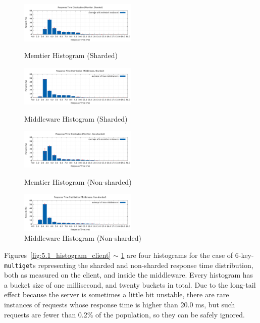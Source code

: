 \begin{figure}[!h]
\parbox{.5\linewidth}{
\centering
\includegraphics[width=0.5\textwidth]{img/5_1_histogram_client.png}
\captionsetup{justification=centering}
\caption{\label{fig:5.1_histogram_client}Memtier Histogram (Sharded)}
}
\parbox{.5\linewidth}{
\centering
\includegraphics[width=0.5\textwidth]{img/5_1_histogram_mw.png}
\captionsetup{justification=centering}
\caption{\label{fig:5.1_histogram_mw}Middleware Histogram (Sharded)}
}

\parbox{.5\linewidth}{
\centering
\includegraphics[width=0.5\textwidth]{img/5_2_histogram_client.png}
\captionsetup{justification=centering}
\caption{\label{fig:5.2_histogram_client}Memtier Histogram (Non-sharded)}
}
\parbox{.5\linewidth}{
\centering
\includegraphics[width=0.5\textwidth]{img/5_2_histogram_mw.png}
\captionsetup{justification=centering}
\caption{\label{fig:5.2_histogram_mw}Middleware Histogram (Non-sharded)}
}
\end{figure}

Figures~\ref{fig:5.1_histogram_client} $\sim$ \ref{fig:5.2_histogram_mw} are four histograms for the case of 6-key-\texttt{multiget}s representing the sharded and non-sharded response time distribution, both as measured on the client, and inside the middleware. Every histogram has a bucket size of one millisecond, and twenty buckets in total. Due to the long-tail effect because the server is sometimes a little bit unstable, there are rare instances of requests whose response time is higher than 20.0 ms, but such requests are fewer than 0.2\% of the population, so they can be safely ignored.

